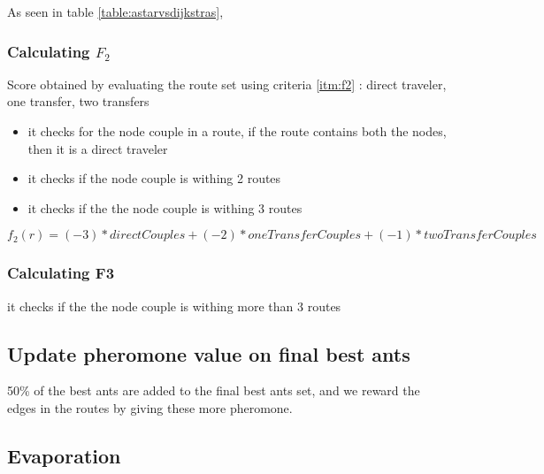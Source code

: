 As seen in table \ref{table:astarvsdijkstras},
 

\subsubsection{Calculating $F_{2}$}
Score obtained by evaluating the route set using criteria \ref{itm:f2} : direct traveler, one transfer, two transfers


\begin{itemize}
\item it checks for the node couple in a route, if the route contains both the nodes, then it is a direct traveler
\item it checks if the node couple is withing 2 routes
\item it checks if the the node couple is withing 3 routes
\end{itemize}

$f_2(r) = (-3) * directCouples + (-2) * oneTransferCouples + (-1) * twoTransferCouples $

\subsubsection{Calculating F3}
it checks if the the node couple is withing more than 3 routes


\subsection{Update pheromone value on final best ants}

\begin{algorithm}[H]
\end{algorithm}

50\% of the best ants are added to the final best ants set, and we reward the edges in the routes by giving these more pheromone.

\subsection{Evaporation}

